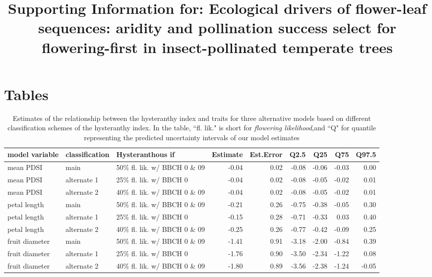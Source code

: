 \documentclass{article}[11pt]
\title{Supporting Information for: Ecological drivers of flower-leaf sequences: aridity and pollination success select for flowering-first in insect-pollinated temperate trees} %
\date{}
\begin{document}

\maketitle

\section*{Tables}
\begin{table}[ht]
\centering
\begin{tabular}[width=.8\textwidth]{|lllrrrrrr|}
  \hline
 model variable & classification & Hysteranthous if & Estimate & Est.Error & Q2.5 & Q25 & Q75 & Q97.5 \\ 
  \hline
 mean PDSI & main & 50\% fl. lik.  w/ BBCH 0 \& 09 & -0.04 & 0.02 & -0.08 & -0.06 & -0.03 & 0.00 \\ 
 mean PDSI & alternate 1 & 25\% fl. lik. w/ BBCH 0 & -0.04 & 0.02 & -0.08 & -0.05 & -0.02 & 0.01 \\ 
 mean PDSI & alternate 2 & 40\% fl. lik. w/ BBCH 0 \& 09 & -0.04 & 0.02 & -0.08 & -0.05 & -0.02 & 0.01 \\ 
  \hline
 petal length & main & 50\% fl. lik.  w/ BBCH 0 \& 09 & -0.21 & 0.26 & -0.75 & -0.38 & -0.05 & 0.30 \\ 
 petal length & alternate 1 & 25\% fl. lik. w/ BBCH 0 & -0.15 & 0.28 & -0.71 & -0.33 & 0.03 & 0.40 \\ 
 petal length & alternate 2 & 40\% fl. lik. w/ BBCH 0 \& 09 & -0.25 & 0.26 & -0.77 & -0.42 & -0.09 & 0.25 \\ 
  \hline
 fruit diameter & main & 50\% fl. lik.  w/ BBCH 0 \& 09 & -1.41 & 0.91 & -3.18 & -2.00 & -0.84 & 0.39 \\ 
 fruit diameter & alternate 1 & 25\% fl. lik. w/ BBCH 0 & -1.76 & 0.90 & -3.50 & -2.34 & -1.22 & 0.08 \\ 
fruit diameter & alternate 2 & 40\% fl. lik. w/ BBCH 0 \& 09 & -1.80 & 0.89 & -3.56 & -2.38 & -1.24 & -0.05 \\ 
   \hline
\end{tabular}
\caption{Estimates of the relationship between the hysteranthy index and traits for three alternative models based on different classification schemes of the hysteranthy index. In the table, ``fl. lik." is short for \emph{flowering likelihood},and ``Q" for quantile representing the predicted uncertainty intervals of our model estimates }
\label{tab:modput}
\end{table}
\pagebreak
\end{document}
